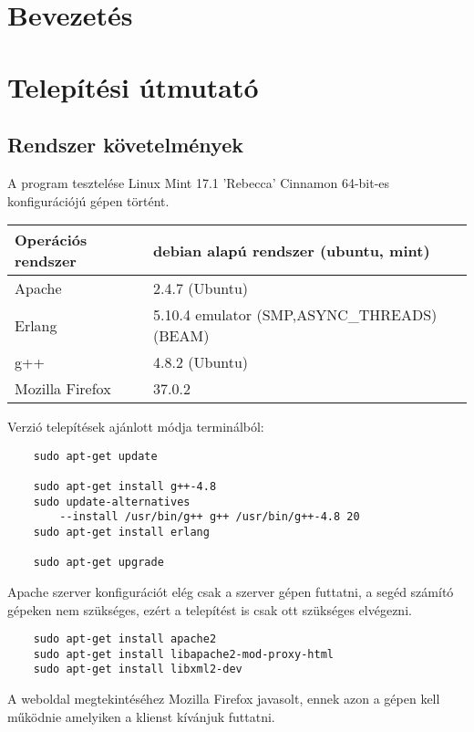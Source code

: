 \begin{comment}
	A Felhasználói dokumentáció tartalmazza
	- a megoldott probléma rövid megfogalmazását,
	- a felhasznált módszerek rövid leírását,
	- a program használatához szükséges összes információt

	Magába foglalja a telepítési- (vagy üzemeltetési-) és a végfelhasználói leírást. Ezek
	meghatározott célközönséghez szólnak, könnyen és gyorsan kell, hogy eligazítsák a
	felhasználót a program használatában!

\end{comment}

\section{Bevezetés}
\section{Telepítési útmutató}
\subsection{Rendszer követelmények}
	A program tesztelése Linux Mint 17.1 'Rebecca' Cinnamon 64-bit-es konfigurációjú gépen történt.
	\begin{center}
  	\begin{tabular}{| p{5cm} | p{8cm} |} 
  	\hline
        Operációs rendszer & debian alapú rendszer (ubuntu, mint)
    \\ \hline
        Apache & 2.4.7 (Ubuntu)
    \\ \hline
        Erlang & 5.10.4 emulator \newline (SMP,ASYNC\_THREADS) (BEAM)
    \\ \hline
        g++ & 4.8.2 (Ubuntu)
    \\ \hline
        Mozilla Firefox & 37.0.2
    \\ \hline
    
    \end{tabular}
    \end{center}

    Verzió telepítések ajánlott módja terminálból:
	\begin{verbatim}
	sudo apt-get update

	sudo apt-get install g++-4.8
	sudo update-alternatives 
	    --install /usr/bin/g++ g++ /usr/bin/g++-4.8 20
	sudo apt-get install erlang

	sudo apt-get upgrade
	\end{verbatim}
	Apache szerver konfigurációt elég csak a szerver gépen futtatni, a segéd számító gépeken nem szükséges, ezért a telepítést is csak ott szükséges elvégezni.
	\begin{verbatim}
	sudo apt-get install apache2
	sudo apt-get install libapache2-mod-proxy-html
	sudo apt-get install libxml2-dev
	\end{verbatim}
	A weboldal megtekintéséhez Mozilla Firefox javasolt, ennek azon a gépen kell működnie amelyiken a klienst kívánjuk futtatni.
